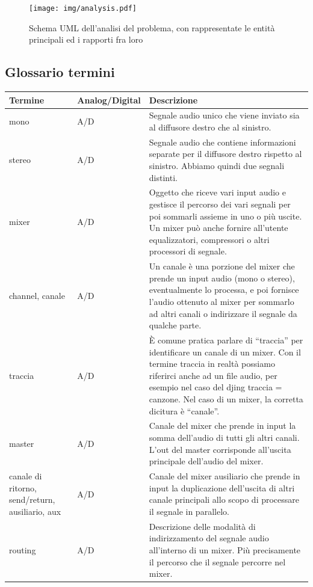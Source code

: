 \documentclass[a4paper,12pt]{report}
\begin{document}
\begin{figure}[H]
\centering{}
\texttt{[image: img/analysis.pdf]}
\caption{Schema UML dell'analisi del problema, con rappresentate le entità principali ed i rapporti fra loro}
\label{img:analysis}
\end{figure}

\subsection{Glossario termini}
\begin{center}
\begin{longtable}{| m{5em} | m{3cm}| m{7cm} |} 
 \hline
 Termine & Analog/Digital & Descrizione \\ [0.5ex] 
 \hline
 mono & A/D & Segnale audio unico che viene inviato sia al diffusore destro che al sinistro. \\ 
 \hline
 stereo & A/D & Segnale audio che contiene informazioni separate per il diffusore destro rispetto al sinistro.
Abbiamo quindi due segnali distinti. \\
 \hline
 mixer & A/D & Oggetto che riceve vari input audio e gestisce il percorso dei vari segnali  per poi sommarli assieme in uno o più uscite.
Un mixer può anche fornire all’utente equalizzatori, compressori o altri processori di segnale. \\
 \hline
 channel, canale & A/D & Un canale è una porzione del mixer che prende un input audio (mono o stereo), eventualmente lo processa, e poi fornisce l’audio ottenuto al mixer per sommarlo ad altri canali o indirizzare il segnale da qualche parte. \\
 \hline
 traccia & A/D & È comune pratica parlare di “traccia” per identificare un canale di un mixer. Con il termine traccia in realtà possiamo riferirci anche ad un file audio, per esempio nel caso del djing traccia = canzone. Nel caso di un mixer, la corretta dicitura è “canale”. \\ 
 \hline
 master & A/D & Canale del mixer che prende in input la somma dell’audio di tutti gli altri canali. L’out del master corrisponde all’uscita principale dell’audio del mixer. \\
 \hline 
 canale di ritorno, send/return, ausiliario, aux & A/D & Canale del mixer ausiliario che prende in input la duplicazione dell’uscita di altri canale principali allo scopo di processare il segnale in parallelo. \\
 \hline
 routing & A/D & Descrizione delle modalità di indirizzamento del segnale audio all’interno di un mixer. Più precisamente il percorso che il segnale percorre nel mixer. \\

\end{longtable}
\end{center}
\end{document}
